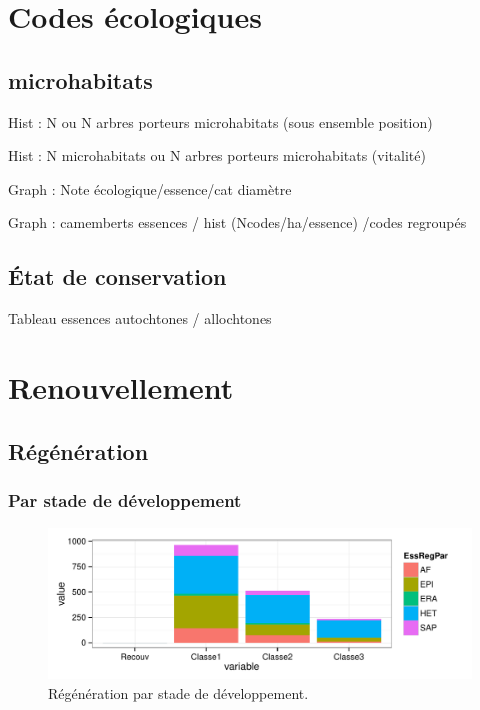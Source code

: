 \documentclass[a4paper]{book}\usepackage[]{graphicx}\usepackage[]{color}
\makeatletter
\def\maxwidth{ %
  \ifdim\Gin@nat@width>\linewidth
    \linewidth
  \else
    \Gin@nat@width
  \fi
}
\newenvironment{knitrout}{}{} %
\makeatother
\begin{document}
\chapter{Codes écologiques}

\section{microhabitats}
Hist : N  ou N arbres porteurs microhabitats (sous ensemble position)

Hist : N microhabitats ou N arbres porteurs microhabitats (vitalité)

Graph : Note écologique/essence/cat diamètre

Graph : camemberts essences / hist (Ncodes/ha/essence) /codes regroupés


\section{État de conservation}

Tableau essences autochtones / allochtones


\chapter{Renouvellement}

\section{Régénération}

\subsection{Par stade de développement}
\begin{knitrout}\footnotesize
{}\color{fgcolor}\begin{figure}[h]


{\centering \includegraphics[width=\maxwidth]{Figures/Rege1-1} 

}

\caption[Régénération par stade de développement]{Régénération par stade de développement.\label{fig:Rege1}}
\end{figure}


\end{knitrout}
\end{document}
